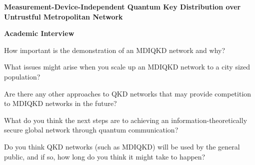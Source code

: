 \documentclass{exam}
\begin{document}
\begin{EnvFullwidth}
\Large \centering \textbf{Measurement-Device-Independent Quantum Key Distribution over Untrustful Metropolitan Network}
\end{EnvFullwidth}

\begin{EnvFullwidth}
\centering \textbf{Academic Interview}
\end{EnvFullwidth}

\begin{questions}
\question
How important is the demonstration of an MDIQKD network and why?
\fillwithlines{1in}

\question
What issues might arise when you scale up an MDIQKD network to a city sized population? 
\fillwithlines{1in}

\question
Are there any other approaches to QKD networks that may provide competition to MDIQKD networks in the future? 
\fillwithlines{1in}

\question
What do you think the next steps are to achieving an information-theoretically secure global network through quantum communication? 
\fillwithlines{1in}


\question
Do you think QKD networks (such as MDIQKD) will be used by the general public, and if so, how long do you think it might take to happen? 
\fillwithlines{1in}
\end{questions}
\end{document}
